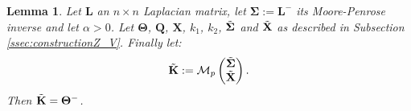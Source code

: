 \documentclass[12pt]{article}
\theoremstyle{plain}
\newtheorem{lemma}[theorem]{Lemma}
\newtheorem{proposition}{Proposition}
\newtheorem{corollary}{Corollary}
\theoremstyle{remark}
\newcommand{\Mv}[3]{\mathcal{M}_{#1}\begin{pmatrix}
	#2\\
	#3
\end{pmatrix}}
\newcommand{\latMatr}[1]{\mathbf{#1}}          %
\newcommand{\grMatr}[1]{{\boldsymbol{#1}}}   %
\begin{document}
    
    \begin{lemma}
    	\label{lem:KinverseTheta}
    	Let $\latMatr{L}$ an $n\times n$ Laplacian matrix, let ${\grMatr{\Sigma}}:={\latMatr{L}}^-$ its Moore-Penrose inverse and let $\alpha > 0$. Let $\grMatr{\Theta}$, $\latMatr Q$, $\latMatr X$, $k_1$, $k_2$, $\Tilde{{\grMatr{\Sigma}}}$ and $\Tilde{\latMatr X}$ as described in Subsection \ref{ssec:constructionZ_V}. Finally let:
    	\begin{equation}
            \label{eq:defKTilde}
    		\Tilde {\latMatr K} := \Mv{p}{\Tilde {\grMatr{\Sigma}}}{\Tilde {\latMatr X}}.
    	\end{equation}
    	Then $\Tilde{\latMatr K}=\grMatr{\Theta}^-$.
    \end{lemma}
    
\end{document}
